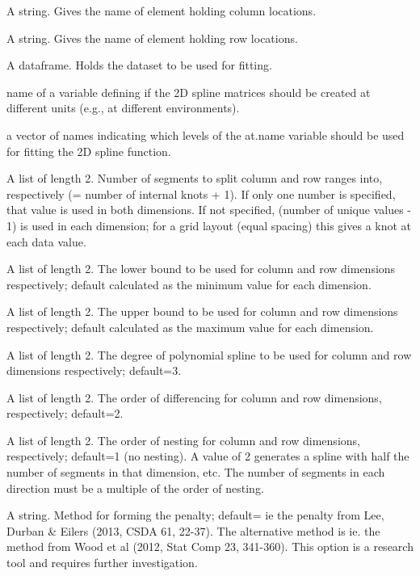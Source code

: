 \documentclass[a4paper]{book}
\begin{document}
\begin{Arguments}
\begin{ldescription}
\item[\code{x.coord.name}] A string. Gives the name of  element
holding column locations.

\item[\code{y.coord.name}] A string. Gives the name of  element
holding row locations.

\item[\code{data}] A dataframe. Holds the dataset to be used for fitting.

\item[\code{at.name}] name of a variable defining if the 2D spline matrices should be created at different units (e.g., at different environments).

\item[\code{at.levels}] a vector of names indicating which levels of the at.name variable should be used for fitting the 2D spline function.

\item[\code{nsegments}] A list of length 2. Number of segments to split column and
row ranges into, respectively (= number of internal knots + 1). If only
one number is specified, that value is used in both dimensions. If not
specified, (number of unique values - 1) is used in each dimension;
for a grid layout (equal spacing) this gives a knot at each data value.

\item[\code{minbound}] A list of length 2. The lower bound to be used for column
and row dimensions respectively; default calculated as the minimum value
for each dimension.

\item[\code{maxbound}] A list of length 2. The upper bound to be used for column
and row dimensions respectively; default calculated as the maximum value
for each dimension.

\item[\code{degree}] A list of length 2. The degree of polynomial spline to be used
for column and row dimensions respectively; default=3.

\item[\code{penaltyord}] A list of length 2. The order of differencing for column
and row dimensions, respectively; default=2.

\item[\code{nestorder}] A list of length 2. The order of nesting for column and row
dimensions, respectively; default=1 (no nesting). A value of 2 generates
a spline with half the number of segments in that dimension, etc. The
number of segments in each direction must be a multiple of the order
of nesting.

\item[\code{method}] A string. Method for forming the  penalty; default=
ie the penalty from Lee, Durban \& Eilers (2013, CSDA 61, 22-37). The
alternative method is  ie. the method from Wood et al (2012,
Stat Comp 23, 341-360).
This option is a research tool and requires further investigation.

\end{ldescription}
\end{Arguments}
\end{document}
